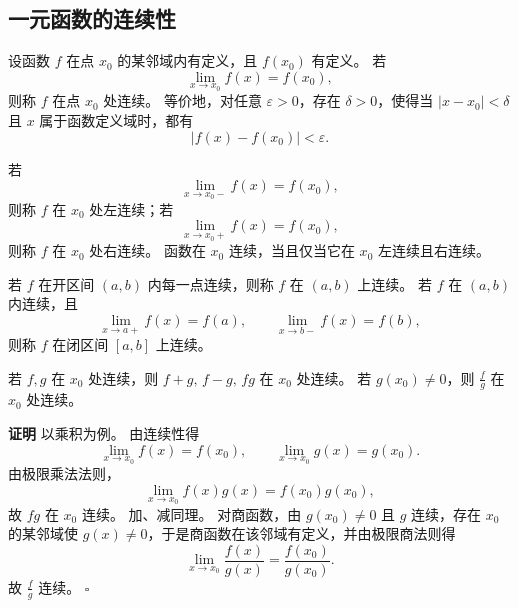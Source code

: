 \documentclass[fontset=fandol]{ctexart}
\newenvironment{proofdetail}{\par\noindent\textbf{证明}\quad}{\hfill$\square$\par\vspace{0.8em}}
\begin{document}
\subsection{一元函数的连续性}

\begin{definition}[函数在一点连续]
设函数 $f$ 在点 $x_0$ 的某邻域内有定义，且 $f(x_0)$ 有定义。 若
\[
\lim_{x\to x_0}f(x)=f(x_0),
\]
则称 $f$ 在点 $x_0$ 处连续。 等价地，对任意 $\varepsilon>0$，存在 $\delta>0$，使得当 $|x-x_0|<\delta$ 且 $x$ 属于函数定义域时，都有
\[
|f(x)-f(x_0)|<\varepsilon.
\]
\end{definition}

\begin{definition}[左右连续]
若
\[
\lim_{x\to x_0-}f(x)=f(x_0),
\]
则称 $f$ 在 $x_0$ 处左连续；若
\[
\lim_{x\to x_0+}f(x)=f(x_0),
\]
则称 $f$ 在 $x_0$ 处右连续。 函数在 $x_0$ 连续，当且仅当它在 $x_0$ 左连续且右连续。
\end{definition}

\begin{definition}[区间上的连续]
若 $f$ 在开区间 $(a,b)$ 内每一点连续，则称 $f$ 在 $(a,b)$ 上连续。 若 $f$ 在 $(a,b)$ 内连续，且
\[
\lim_{x\to a+}f(x)=f(a),\qquad \lim_{x\to b-}f(x)=f(b),
\]
则称 $f$ 在闭区间 $[a,b]$ 上连续。
\end{definition}

\begin{center}
\qquad
{}
\end{center}


\begin{proposition}[四则运算]
若 $f,g$ 在 $x_0$ 处连续，则 $f+g,\,f-g,\,fg$ 在 $x_0$ 处连续。 若 $g(x_0)\neq0$，则 $\frac{f}{g}$ 在 $x_0$ 处连续。
\end{proposition}
\begin{proofdetail}
以乘积为例。 由连续性得
\[
\lim_{x\to x_0}f(x)=f(x_0),\qquad \lim_{x\to x_0}g(x)=g(x_0).
\]
由极限乘法法则，
\[
\lim_{x\to x_0}f(x)g(x)=f(x_0)g(x_0),
\]
故 $fg$ 在 $x_0$ 连续。 加、减同理。 对商函数，由 $g(x_0)\neq0$ 且 $g$ 连续，存在 $x_0$ 的某邻域使 $g(x)\neq0$，于是商函数在该邻域有定义，并由极限商法则得
\[
\lim_{x\to x_0}\frac{f(x)}{g(x)}=\frac{f(x_0)}{g(x_0)}.
\]
故 $\frac{f}{g}$ 连续。
\end{proofdetail}
\end{document}
